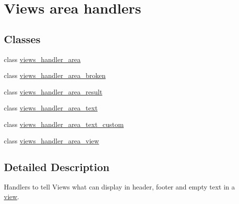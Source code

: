 \hypertarget{group__views__area__handlers}{
\section{Views area handlers}
\label{group__views__area__handlers}
}
\subsection*{Classes}
\begin{DoxyCompactItemize}
\item 
class \hyperlink{classviews__handler__area}{views\_\-handler\_\-area}
\item 
class \hyperlink{classviews__handler__area__broken}{views\_\-handler\_\-area\_\-broken}
\item 
class \hyperlink{classviews__handler__area__result}{views\_\-handler\_\-area\_\-result}
\item 
class \hyperlink{classviews__handler__area__text}{views\_\-handler\_\-area\_\-text}
\item 
class \hyperlink{classviews__handler__area__text__custom}{views\_\-handler\_\-area\_\-text\_\-custom}
\item 
class \hyperlink{classviews__handler__area__view}{views\_\-handler\_\-area\_\-view}
\end{DoxyCompactItemize}


\subsection{Detailed Description}
Handlers to tell Views what can display in header, footer and empty text in a \hyperlink{classview}{view}. 